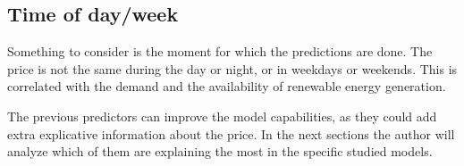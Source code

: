 \subsection{Time of day/week}
Something to consider is the moment for which the predictions are done.
The price is not the same during the day or night, or in weekdays or weekends.
This is correlated with the demand and the availability of renewable energy generation.

\vspace{1.3cm}

The previous predictors can improve the model capabilities, as they could add extra explicative information about the price.
In the next sections the author will analyze which of them are explaining the most in the specific studied models.


